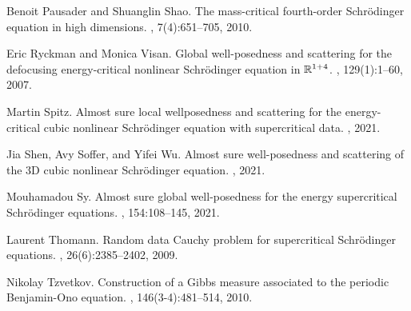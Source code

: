 \documentclass[aihp]{imsart}
\numberwithin{equation}{section}
\theoremstyle{plain}
\theoremstyle{remark}
\begin{document}
\begin{thebibliography}{}
Benoit Pausader and Shuanglin Shao.
\newblock The mass-critical fourth-order {S}chr\"{o}dinger equation in high
  dimensions.
, 7(4):651--705, 2010.

Eric Ryckman and Monica Visan.
\newblock Global well-posedness and scattering for the defocusing
  energy-critical nonlinear {S}chr\"{o}dinger equation in {$\Bbb R^{1+4}$}.
, 129(1):1--60, 2007.

Martin Spitz.
\newblock Almost sure local wellposedness and scattering for the
  energy-critical cubic nonlinear {S}chr\" odinger equation with supercritical
  data.
, 2021.

Jia Shen, Avy Soffer, and Yifei Wu.
\newblock Almost sure well-posedness and scattering of the 3D cubic nonlinear Schr\" odinger equation.
, 2021.

Mouhamadou Sy.
\newblock Almost sure global well-posedness for the energy supercritical
  {S}chr\"{o}dinger equations.
, 154:108--145, 2021.

Laurent Thomann.
\newblock Random data {C}auchy problem for supercritical {S}chr\"{o}dinger
  equations.
,
  26(6):2385--2402, 2009.

Nikolay Tzvetkov.
\newblock Construction of a {G}ibbs measure associated to the periodic
  {B}enjamin-{O}no equation.
, 146(3-4):481--514, 2010.

 \end{thebibliography}
\end{document}
